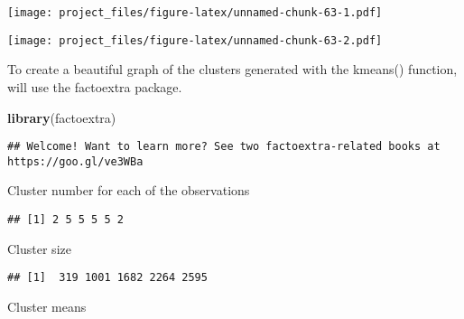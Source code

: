 \documentclass[
]{article}
\newenvironment{Shaded}{\begin{snugshade}}{\end{snugshade}}
\newcommand{\CommentTok}[1]{\textcolor[rgb]{0.56,0.35,0.01}{\textit{#1}}}
\newcommand{\KeywordTok}[1]{\textcolor[rgb]{0.13,0.29,0.53}{\textbf{#1}}}
\newcommand{\NormalTok}[1]{#1}
\newcommand{\OperatorTok}[1]{\textcolor[rgb]{0.81,0.36,0.00}{\textbf{#1}}}
\begin{document}
\texttt{[image: project\_files/figure-latex/unnamed-chunk-63-1.pdf]}

\begin{Shaded}
\end{Shaded}

\texttt{[image: project\_files/figure-latex/unnamed-chunk-63-2.pdf]}

To create a beautiful graph of the clusters generated with the kmeans()
function, will use the factoextra package.

\begin{Shaded}
\begin{Highlighting}[]
\KeywordTok{library}\NormalTok{(factoextra)}
\end{Highlighting}
\end{Shaded}

\begin{verbatim}
## Welcome! Want to learn more? See two factoextra-related books at https://goo.gl/ve3WBa
\end{verbatim}

Cluster number for each of the observations

\begin{Shaded}
\end{Shaded}

\begin{verbatim}
## [1] 2 5 5 5 5 2
\end{verbatim}

Cluster size

\begin{Shaded}
\end{Shaded}

\begin{verbatim}
## [1]  319 1001 1682 2264 2595
\end{verbatim}

Cluster means
\end{document}
